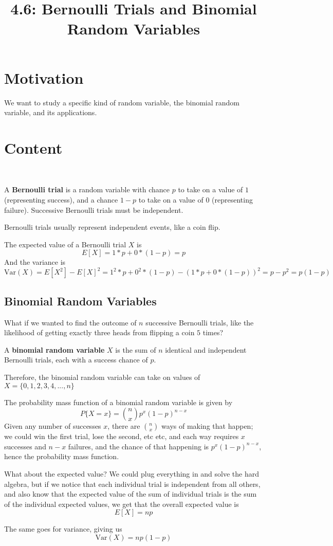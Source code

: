 \documentclass{article}
\title{4.6: Bernoulli Trials and Binomial Random Variables}
\begin{document}
\maketitle
\section{Motivation}

We want to study a specific kind of random variable, the binomial random variable, and its applications.

\section{Content}
\ 
\begin{definition}
A \textbf{Bernoulli trial} is a random variable with chance $p$ to take on a value of $1$ (representing success), and a chance $1-p$ to take on a value of $0$ (representing failure). Successive Bernoulli trials must be independent. 
\end{definition}

Bernoulli trials usually represent independent events, like a coin flip. 

The expected value of a Bernoulli trial $X$ is $$E[X] = 1*p + 0*(1-p) = p$$And the variance is $$\text{Var}(X) = E[X^2] - E[X]^2 = 1^2*p + 0^2*(1-p) - (1*p + 0*(1-p))^2 = p - p^2 = p(1-p)$$

\subsection{Binomial Random Variables}

What if we wanted to find the outcome of $n$ successive Bernoulli trials, like the likelihood of getting exactly three heads from flipping a coin $5$ times? 

\begin{definition}
A \textbf{binomial random variable} $X$ is the sum of $n$ identical and independent Bernoulli trials, each with a success chance of $p$. 
\end{definition}

Therefore, the binomial random variable can take on values of $X = \{0,1,2,3,4,...,n\}$

The probability mass function of a binomial random variable is given by $$P\{X = x\} = \binom{n}{x}p^x (1-p)^{n-x}$$Given any number of successes $x$, there are $\binom{n}{x}$ ways of making that happen; we could win the first trial, lose the second, etc etc, and each way requires $x$ successes and $n-x$ failures, and the chance of that happening is $p^x(1-p)^{n-x}$, hence the probability mass function.

What about the expected value? We could plug everything in and solve the hard algebra, but if we notice that each individual trial is independent from all others, and also know that the expected value of the sum of individual trials is the sum of the individual expected values, we get that the overall expected value is $$E[X] = np$$

The same goes for variance, giving us $$\text{Var}(X) = np(1-p)$$  
\end{document}
